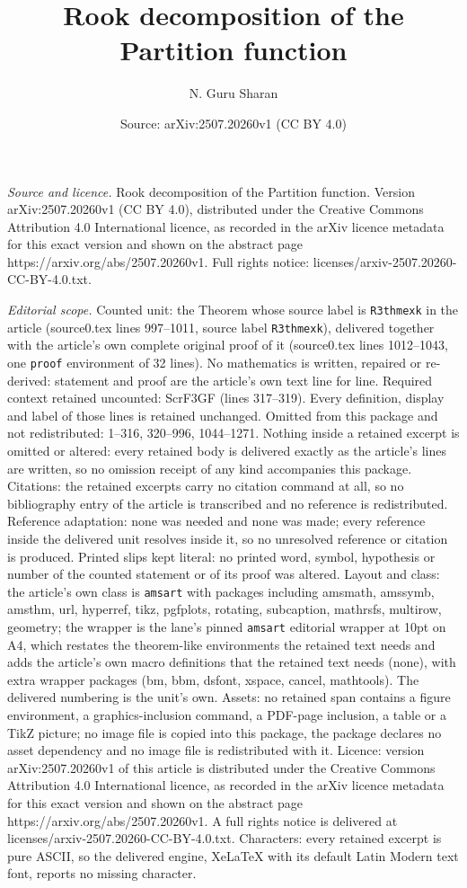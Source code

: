 \documentclass[10pt,a4paper]{amsart}
\title[Rook decomposition of the Partition function]{Rook decomposition of the Partition function}
\author{N. Guru Sharan}
\date{Source: arXiv:2507.20260v1 (CC BY 4.0)}
\begin{document}
\maketitle

\noindent\emph{Source and licence.} Rook decomposition of the Partition function. Version arXiv:2507.20260v1 (CC BY 4.0), distributed under the Creative Commons Attribution 4.0 International licence, as recorded in the arXiv licence metadata for this exact version and shown on the abstract page https://arxiv.org/abs/2507.20260v1. Full rights notice: licenses/arxiv-2507.20260-CC-BY-4.0.txt.\par\smallskip

\noindent\textit{Editorial scope.} Counted unit: the Theorem whose source label is \texttt{R3thmexk} in the article (source0.tex lines 997--1011, source label \texttt{R3thmexk}), delivered together with the article's own complete original proof of it (source0.tex lines 1012--1043, one \texttt{proof} environment of 32 lines). No mathematics is written, repaired or re-derived: statement and proof are the article's own text line for line. Required context retained uncounted: ScrF3GF (lines 317--319). Every definition, display and label of those lines is retained unchanged. Omitted from this package and not redistributed: 1--316, 320--996, 1044--1271. Nothing inside a retained excerpt is omitted or altered: every retained body is delivered exactly as the article's lines are written, so no omission receipt of any kind accompanies this package. Citations: the retained excerpts carry no citation command at all, so no bibliography entry of the article is transcribed and no reference is redistributed. Reference adaptation: none was needed and none was made; every reference inside the delivered unit resolves inside it, so no unresolved reference or citation is produced. Printed slips kept literal: no printed word, symbol, hypothesis or number of the counted statement or of its proof was altered. Layout and class: the article's own class is \texttt{amsart} with packages including amsmath, amssymb, amsthm, url, hyperref, tikz, pgfplots, rotating, subcaption, mathrsfs, multirow, geometry; the wrapper is the lane's pinned \texttt{amsart} editorial wrapper at 10pt on A4, which restates the theorem-like environments the retained text needs and adds the article's own macro definitions that the retained text needs (none), with extra wrapper packages (bm, bbm, dsfont, xspace, cancel, mathtools). The delivered numbering is the unit's own. Assets: no retained span contains a figure environment, a graphics-inclusion command, a PDF-page inclusion, a table or a TikZ picture; no image file is copied into this package, the package declares no asset dependency and no image file is redistributed with it. Licence: version arXiv:2507.20260v1 of this article is distributed under the Creative Commons Attribution 4.0 International licence, as recorded in the arXiv licence metadata for this exact version and shown on the abstract page https://arxiv.org/abs/2507.20260v1. A full rights notice is delivered at licenses/arxiv-2507.20260-CC-BY-4.0.txt. Characters: every retained excerpt is pure ASCII, so the delivered engine, XeLaTeX with its default Latin Modern text font, reports no missing character.
\end{document}
